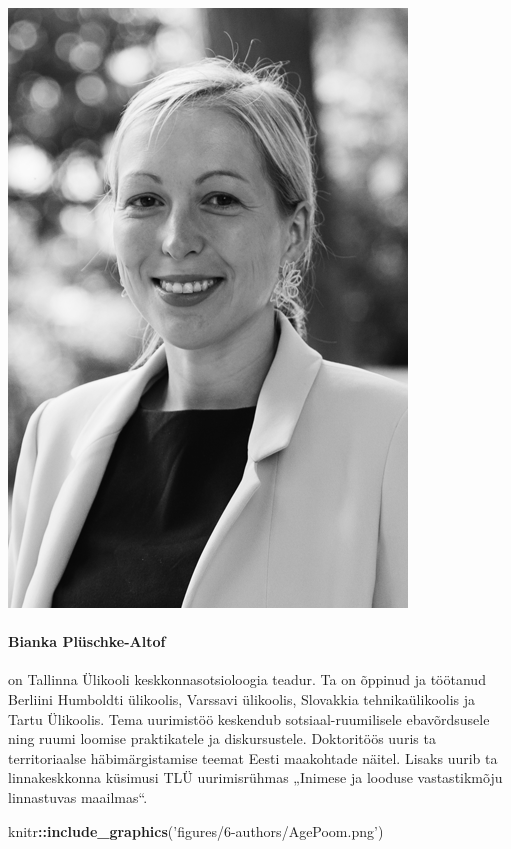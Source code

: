 \documentclass[estonian,]{article}
\newenvironment{Shaded}{\begin{snugshade}}{\end{snugshade}}
\newcommand{\KeywordTok}[1]{\textcolor[rgb]{0.13,0.29,0.53}{\textbf{#1}}}
\newcommand{\NormalTok}[1]{#1}
\newcommand{\OperatorTok}[1]{\textcolor[rgb]{0.81,0.36,0.00}{\textbf{#1}}}
\newcommand{\StringTok}[1]{\textcolor[rgb]{0.31,0.60,0.02}{#1}}
\let\oldparagraph\paragraph
\renewcommand{\paragraph}[1]{\oldparagraph{#1}\mbox{}}
\begin{document}
\begin{flushleft}\includegraphics[width=0.5\linewidth]{figures/6-authors/BiankaPluschke-Altof} \end{flushleft}

\hypertarget{bianka-pluxfcschke-altof}{%
\paragraph{Bianka Plüschke-Altof}\label{bianka-pluxfcschke-altof}}

on Tallinna Ülikooli keskkonnasotsioloogia teadur. Ta on õppinud ja töötanud Berliini Humboldti ülikoolis, Varssavi ülikoolis, Slovakkia tehnikaülikoolis ja Tartu Ülikoolis. Tema uurimistöö keskendub sotsiaal-ruumilisele ebavõrdsusele ning ruumi loomise praktikatele ja diskursustele. Doktoritöös uuris ta territoriaalse häbimärgistamise teemat Eesti maakohtade näitel. Lisaks uurib ta linnakeskkonna küsimusi TLÜ uurimisrühmas „Inimese ja looduse vastastikmõju linnastuvas maailmas``.

\begin{Shaded}
\begin{Highlighting}[]
\NormalTok{knitr}\OperatorTok{::}\KeywordTok{include_graphics}\NormalTok{(}\StringTok{'figures/6-authors/AgePoom.png'}\NormalTok{)}
\end{Highlighting}
\end{Shaded}
\end{document}
